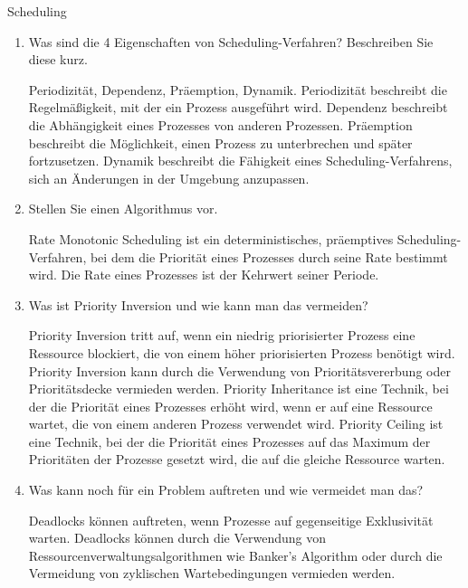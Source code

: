 \documentclass{article}
\begin{document}
\begin{exercise}{Scheduling}
  \begin{enumerate}
    \item Was sind die 4 Eigenschaften von Scheduling-Verfahren? Beschreiben Sie diese kurz.

          \begin{solution}
            Periodizität, Dependenz, Präemption, Dynamik.
            Periodizität beschreibt die Regelmäßigkeit, mit der ein Prozess ausgeführt wird.
            Dependenz beschreibt die Abhängigkeit eines Prozesses von anderen Prozessen.
            Präemption beschreibt die Möglichkeit, einen Prozess zu unterbrechen und später fortzusetzen.
            Dynamik beschreibt die Fähigkeit eines Scheduling-Verfahrens, sich an Änderungen in der Umgebung anzupassen.
          \end{solution}

    \item Stellen Sie einen Algorithmus vor.

          \begin{solution}
            Rate Monotonic Scheduling ist ein deterministisches, präemptives Scheduling-Verfahren, bei dem die Priorität eines Prozesses durch seine Rate bestimmt wird. Die Rate eines Prozesses ist der Kehrwert seiner Periode.
          \end{solution}

    \item Was ist Priority Inversion und wie kann man das vermeiden?

          \begin{solution}
            Priority Inversion tritt auf, wenn ein niedrig priorisierter Prozess eine Ressource blockiert, die von einem höher priorisierten Prozess benötigt wird. Priority Inversion kann durch die Verwendung von Prioritätsvererbung oder Prioritätsdecke vermieden werden.
            Priority Inheritance ist eine Technik, bei der die Priorität eines Prozesses erhöht wird, wenn er auf eine Ressource wartet, die von einem anderen Prozess verwendet wird.
            Priority Ceiling ist eine Technik, bei der die Priorität eines Prozesses auf das Maximum der Prioritäten der Prozesse gesetzt wird, die auf die gleiche Ressource warten.
          \end{solution}

    \item Was kann noch für ein Problem auftreten und wie vermeidet man das?

          \begin{solution}
            Deadlocks können auftreten, wenn Prozesse auf gegenseitige Exklusivität warten. Deadlocks können durch die Verwendung von Ressourcenverwaltungsalgorithmen wie Banker's Algorithm oder durch die Vermeidung von zyklischen Wartebedingungen vermieden werden.
          \end{solution}
  \end{enumerate}
\end{exercise}
\end{document}
